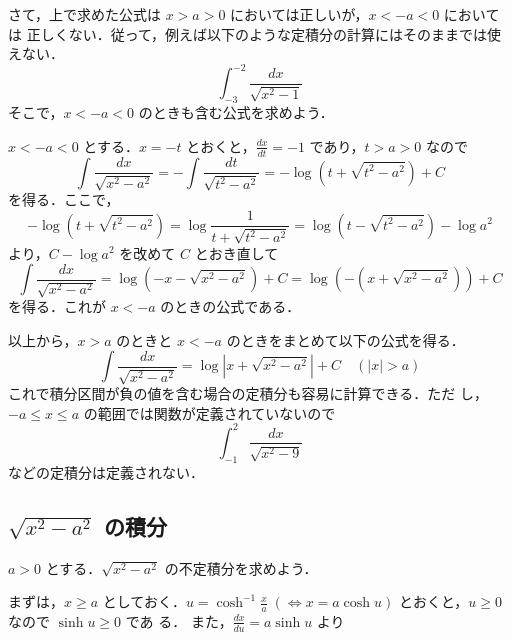 \documentclass[dvipdfmx,12pt, uplatex]{jsarticle}
\newcommand{\ds}{\displaystyle}
\begin{document}
さて，上で求めた公式は $x>a>0$ においては正しいが，$x<-a<0$ においては
正しくない．従って，例えば以下のような定積分の計算にはそのままでは使えない．
\[
  \int_{-3}^{-2} \frac{dx}{\sqrt{x^2-1}}
\]
そこで，$x<-a<0$ のときも含む公式を求めよう．

$x<-a<0$ とする．$x=-t$ とおくと，$\frac{dx}{dt}=-1$ であり，$t > a > 0$ なので
\[
  \int \frac{dx}{\sqrt{x^2-a^2}} = -\int \frac{dt}{\sqrt{t^2-a^2}} = -\log\left( t + \sqrt{t^2-a^2}\right) +C
\]
を得る．ここで，
\[
  -\log \left( t + \sqrt{t^2-a^2} \right) = \log \frac{1}{t+\sqrt{t^2-a^2}} 
  = \log \left(t-\sqrt{t^2-a^2}\right) -\log a^2
\]
より，$C-\log a^2$ を改めて $C$ とおき直して
\[
  \int \frac{dx}{\sqrt{x^2-a^2}} = \log \left( -x -\sqrt{x^2-a^2}\right) +C
  =\log \left(-\left( x+\sqrt{x^2-a^2} \right)\right) +C
\]
を得る．これが $x<-a$ のときの公式である．

以上から，$x>a$ のときと $x<-a$ のときをまとめて以下の公式を得る．
\[
  \int \frac{dx}{\sqrt{x^2-a^2}} = \log \left| x+\sqrt{x^2-a^2} \right| +C \quad \left( \left|x \right| >a \right)
\]
これで積分区間が負の値を含む場合の定積分も容易に計算できる．ただ
し， $-a \leq x \leq a$ の範囲では関数が定義されていないので
\[
  \int_{-1}^{2} \frac{dx}{\sqrt{x^2-9}}
\]
などの定積分は定義されない．

\subsection{ $\ds \sqrt{x^2-a^2}$ の積分}

$a>0$ とする．$\sqrt{x^2-a^2}$ の不定積分を求めよう．

まずは，$x \geq a$
としておく．$u = \cosh^{-1}\frac{x}{a} \; \left( \Leftrightarrow x= a
  \cosh u\right)$ とおくと，$u \geq 0$ なので $\sinh u \geq 0$ であ
る． また，$\frac{dx}{du} = a \sinh u$ より
\end{document}
